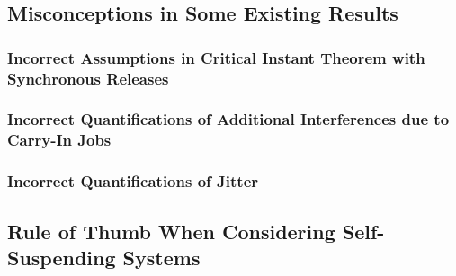 \subsection{Misconceptions in Some Existing Results}
\subsubsection{Incorrect Assumptions in Critical Instant Theorem with Synchronous Releases}
\subsubsection{Incorrect Quantifications of Additional Interferences due to Carry-In Jobs}
\subsubsection{Incorrect Quantifications of Jitter}
\subsection{Rule of Thumb When Considering Self-Suspending Systems}
  
  
  
  
  
  
  
  
  
  
  
  
  